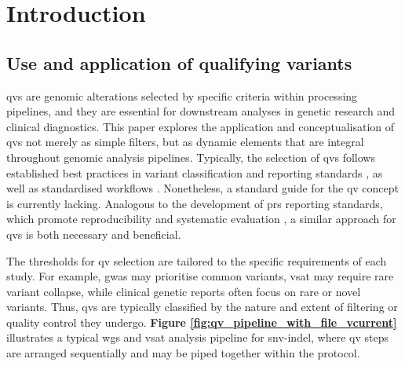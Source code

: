 
\section{Introduction}
\label{sec:intro}
\subsection{Use and application of qualifying variants}

\ac{qv}s are genomic alterations selected by specific criteria within processing pipelines, and they are essential for downstream analyses in genetic research and clinical diagnostics. This paper explores the application and conceptualisation of \ac{qv}s not merely as simple filters, but as dynamic elements that are integral throughout genomic analysis pipelines. Typically, the selection of \ac{qv}s follows established best practices in variant classification and reporting standards \cite{richards2015standards, li2017standards, li2017intervar, riggs2020technical, tavtigian2020fitting}, as well as standardised workflows \cite{pedersen2021effective, anderson2010data, uffelmann2021genome}. Nonetheless, a standard guide for the \ac{qv} concept is currently lacking. Analogous to the development of \ac{prs} reporting standards, which promote reproducibility and systematic evaluation \cite{wand2021improving, lambert2021polygenic}, a similar approach for \ac{qv}s is both necessary and beneficial.

The thresholds for \ac{qv} selection are tailored to the specific requirements of each study. For example, \ac{gwas} may prioritise common variants, \ac{vsat} may require rare variant collapse, while clinical genetic reports often focus on rare or novel variants. Thus, \ac{qv}s are typically classified by the nature and extent of filtering or quality control they undergo. \textbf{Figure \ref{fig:qv_pipeline_with_file_vcurrent}} illustrates a typical \ac{wgs} and \ac{vsat} analysis pipeline for \ac{snv}-\ac{indel}, where \ac{qv} steps are arranged sequentially and may be piped together within the protocol.

